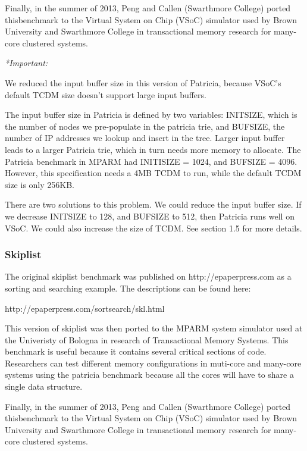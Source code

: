 \documentclass{article}
\begin{document}
Finally, in the summer of 2013, Peng and Callen (Swarthmore College) ported 
thisbenchmark to the Virtual System on Chip (VSoC) simulator used by Brown 
University and Swarthmore College in transactional memory research for 
many-core clustered systems. 

\vspace{2mm}
\emph{*Important:} 

We reduced the input buffer size in this version of Patricia, because VSoC's default TCDM size doesn't support large input buffers. 

The input buffer size in Patricia is defined by two variables: INITSIZE, which is the number of nodes we pre-populate in the patricia trie, and BUFSIZE, the number of IP addresses we lookup and insert in the tree. Larger input buffer leads to a larger Patricia trie, which in turn needs more memory to allocate. The Patricia benchmark in MPARM had INITISIZE = 1024, and BUFSIZE = 4096. However, this specification needs a 4MB TCDM to run, while the default TCDM size is only 256KB. 

There are two solutions to this problem. We could reduce the input buffer size. If we decrease INITSIZE to 128, and BUFSIZE to 512, then Patricia runs well on VSoC. We could also increase the size of TCDM. See section 1.5 for more details.

\subsubsection{Skiplist}

The original skiplist benchmark was published on http://epaperpress.com
as a sorting and searching example. The descriptions can be found here:

http://epaperpress.com/sortsearch/skl.html

This version of skiplist was then ported to the MPARM system simulator used at 
the Univeristy of Bologna in research of Transactional Memory Systems. This
benchmark is useful because it contains several critical sections of code. 
Researchers can test different memory configurations in muti-core and 
many-core systems using the patricia benchmark because all the cores will have 
to share a single data structure. 

Finally, in the summer of 2013, Peng and Callen (Swarthmore College) ported 
thisbenchmark to the Virtual System on Chip (VSoC) simulator used by Brown 
University and Swarthmore College in transactional memory research for 
many-core clustered systems. 
\end{document}
